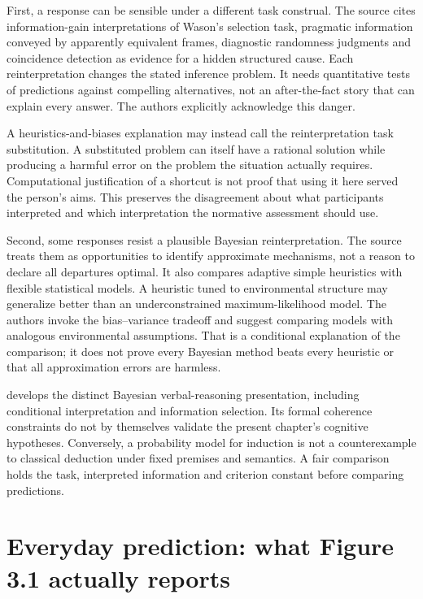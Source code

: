 First, a response can be sensible under a different task construal. The
source cites information-gain interpretations of Wason's selection task,
pragmatic information conveyed by apparently equivalent frames, diagnostic
randomness judgments and coincidence detection as evidence for a hidden
structured cause. Each reinterpretation changes the stated inference
problem. It needs quantitative tests of predictions against compelling
alternatives, not an after-the-fact story that can explain every answer.
The authors explicitly acknowledge this danger.

A heuristics-and-biases explanation may instead call the reinterpretation
task substitution. A substituted problem can itself have a rational
solution while producing a harmful error on the problem the situation
actually requires. Computational justification of a shortcut is not proof
that using it here served the person's aims. This preserves the disagreement
about what participants interpreted and which interpretation the normative
assessment should use.

Second, some responses resist a plausible Bayesian reinterpretation.
The source treats them as opportunities to identify approximate mechanisms,
not a reason to declare all departures optimal. It also compares adaptive
simple heuristics with flexible statistical models. A heuristic tuned to
environmental structure may generalize better than an underconstrained
maximum-likelihood model. The authors invoke the bias--variance tradeoff
and suggest comparing models with analogous environmental assumptions.
That is a conditional explanation of the comparison; it does not prove
every Bayesian method beats every heuristic or that all approximation
errors are harmless.

 develops the distinct Bayesian verbal-reasoning
presentation, including conditional interpretation and information selection.
Its formal coherence constraints do not by themselves validate the present
chapter's cognitive hypotheses. Conversely, a probability model for
induction is not a counterexample to classical deduction under fixed
premises and semantics. A fair comparison holds the task, interpreted
information and criterion constant before comparing predictions.

\section{Everyday prediction: what Figure 3.1 actually reports}
\label{sec:p19-bci-everyday}

